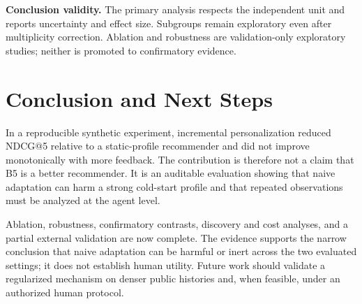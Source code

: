 \documentclass[sigconf,anonymous,review,natbib=false]{acmart}
\begin{document}
\textbf{Conclusion validity.} The primary analysis respects the independent
unit and reports uncertainty and effect size. Subgroups remain exploratory even
after multiplicity correction. Ablation and robustness are validation-only exploratory studies; neither is
promoted to confirmatory evidence.

\section{Conclusion and Next Steps}

In a reproducible synthetic experiment, incremental personalization reduced
NDCG@5 relative to a static-profile recommender and did not improve monotonically
with more feedback. The contribution is therefore not a claim that B5 is a
better recommender. It is an auditable evaluation showing that naive adaptation
can harm a strong cold-start profile and that repeated observations must be
analyzed at the agent level.

Ablation, robustness, confirmatory contrasts, discovery and cost analyses, and
a partial external validation are now complete. The evidence supports the
narrow conclusion that naive adaptation can be harmful or inert across the two
evaluated settings; it does not establish human utility. Future work should
validate a regularized mechanism on denser public histories and, when feasible,
under an authorized human protocol.

\printbibliography
\end{document}

